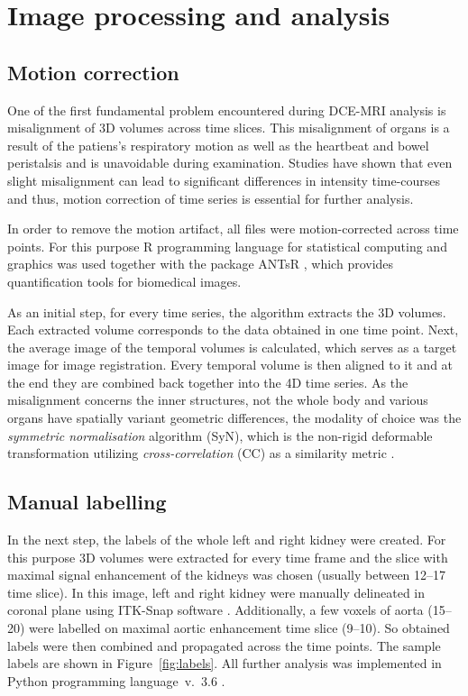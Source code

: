 \section{Image processing and analysis}

\subsection{Motion correction}
One of the first fundamental problem encountered during DCE-MRI analysis is misalignment of 3D volumes across time slices. This misalignment of organs is a result of the patiens's respiratory motion as well as the heartbeat and bowel peristalsis and is unavoidable during examination. Studies have shown that even slight misalignment can lead to significant differences in intensity time-courses \cite{KidneySubsegmentation} and thus, motion correction of time series is essential for further analysis.

In order to remove 	the motion artifact, all files were motion-corrected across time points. For this purpose R programming language for statistical computing and graphics was used \cite{R} together with the package ANTsR \cite{ANTsR}, which provides quantification tools for biomedical images. 

As an initial step, for every time series, the algorithm extracts the 3D volumes. Each extracted volume corresponds to the data obtained in one time point. Next, the average image of the temporal volumes is calculated, which serves as a target image for image registration. Every temporal volume is then aligned to it and at the end they are combined back together into the 4D time series.
As the misalignment concerns the inner structures, not the whole body and various organs have spatially variant geometric differences, the modality of choice was the  \textit{symmetric normalisation} algorithm (SyN), which is the non-rigid deformable transformation utilizing \textit{cross-correlation} (CC) as a similarity metric \cite{avants2011reproducible, avants2008symmetric, el2016current}. 

\subsection{Manual labelling}
In the next step, the labels of the whole left and right kidney were created. For this purpose 3D volumes were extracted for every time frame and the slice with maximal signal enhancement of the kidneys was chosen (usually between 12--17 time slice). In this image, left and right kidney were manually delineated in coronal plane using ITK-Snap software \cite{itk-snap}. Additionally, a few voxels of aorta (15--20) were labelled on maximal aortic enhancement time slice (9--10). So obtained labels were then combined and propagated across the time points. The sample labels are shown in Figure~\ref{fig:labels}.
All further analysis was implemented in Python programming language~v.~3.6 \cite{python}.

